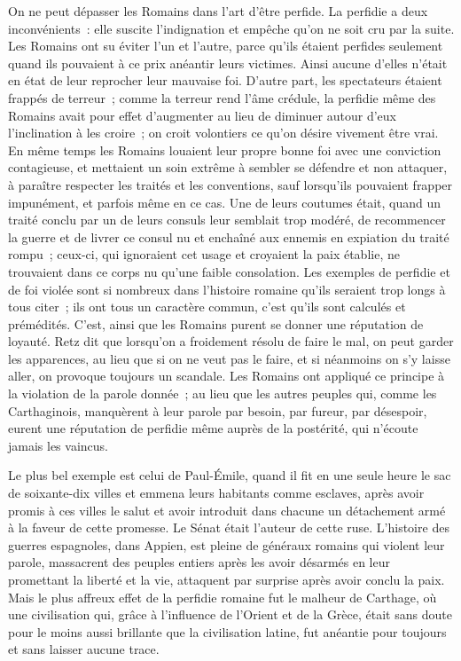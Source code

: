 \documentclass[french,twoside]{book} %
\begin{document}
On ne peut dépasser les Romains dans l'art d'être perfide. La perfidie a deux inconvénients : elle suscite l'indignation et empêche qu'on ne soit cru par la suite. Les Romains ont su éviter l'un et l'autre, parce qu'ils étaient perfides seulement quand ils pouvaient à ce prix anéantir leurs victimes. Ainsi aucune d'elles n'était en état de leur reprocher leur mauvaise foi. D'autre part, les spectateurs étaient frappés de terreur ; comme la terreur rend l'âme crédule, la perfidie même des Romains avait pour effet d'augmenter au lieu de diminuer autour d'eux l'inclination à les croire ; on croit volontiers ce qu'on désire vivement être vrai. En même temps les Romains louaient leur propre bonne foi avec une conviction contagieuse, et mettaient un soin extrême à sembler se défendre et non attaquer, à paraître respecter les traités et les conventions, sauf lorsqu'ils pouvaient frapper impunément, et parfois même en ce cas. Une de leurs coutumes était, quand un traité conclu par un de leurs consuls leur semblait trop modéré, de recommencer la guerre et de livrer ce consul nu et enchaîné aux ennemis en expiation du traité rompu ; ceux-ci, qui ignoraient cet usage et croyaient la paix établie, ne trouvaient dans ce corps nu qu'une faible consolation. Les exemples de perfidie et de foi violée sont si nombreux dans l'histoire romaine qu'ils seraient trop longs à tous citer ; ils ont tous un caractère commun, c'est qu'ils sont calculés et prémédités. C'est, ainsi que les Romains purent se donner une réputation de loyauté. Retz dit que lorsqu'on a froidement résolu de faire le mal, on peut garder les apparences, au lieu que si on ne veut pas le faire, et si néanmoins on s'y laisse aller, on provoque toujours un scandale. Les Romains ont appliqué ce principe à la violation de la parole donnée ; au lieu que les autres peuples qui, comme les Carthaginois, manquèrent à leur parole par besoin, par fureur, par désespoir, eurent une réputation de perfidie même auprès de la postérité, qui n'écoute jamais les vaincus.\par
Le plus bel exemple est celui de Paul-Émile, quand il fit en une seule heure le sac de soixante-dix villes et emmena leurs habitants comme esclaves, après avoir promis à ces villes le salut et avoir introduit dans chacune un détachement armé à la faveur de cette promesse. Le Sénat était l'auteur de cette ruse. L'histoire des guerres espagnoles, dans Appien, est pleine de géné­raux romains qui violent leur parole, massacrent des peuples entiers après les avoir désarmés en leur promettant la liberté et la vie, attaquent par surprise après avoir conclu la paix. Mais le plus affreux effet de la perfidie romaine fut le malheur de Carthage, où une civilisation qui, grâce à l'influence de l'Orient et de la Grèce, était sans doute pour le moins aussi brillante que la civilisation latine, fut anéantie pour toujours et sans laisser aucune trace.\par
\end{document}
